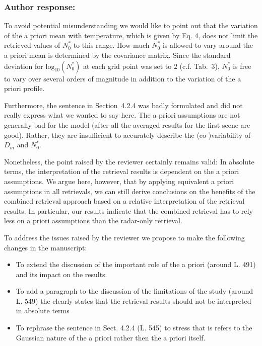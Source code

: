 \documentclass[11pt]{scrartcl}
\begin{document}
\subsubsection*{Author response:}

To avoid potential misunderstanding we would like to point out that the
variation of the a priori mean with temperature, which is given by Eq. 4, does
not limit the retrieved values of $N_0^*$ to this range. How much $N_0^*$ is
allowed to vary around the a priori mean is determined by the covariance matrix.
Since the standard deviation for $\text{log}_{10}(N_0^*)$ at each grid point was
set to $2$ (c.f. Tab.~3), $N_0^*$ is free to vary over several orders of
magnitude in addition to the variation of the a priori profile.

Furthermore, the sentence in Section~4.2.4 was badly formulated and did not
really express what we wanted to say here. The a priori assumptions are not
generally bad for the model (after all the averaged results for the first scene
are good). Rather, they are insufficient to accurately describe the (co-)variability
of $D_m$ and $N_0^*$.

Nonetheless, the point raised by the reviewer certainly remains valid: In
absolute terms, the interpretation of the retrieval results is dependent on the
a priori assumptions. We argue here, however, that by applying equivalent a
priori assumptions in all retrievals, we can still derive conclusions on the
benefits of the combined retrieval approach based on a relative interpretation
of the retrieval results. In particular, our results indicate that the combined
retrieval has to rely less on a priori assumptions than the radar-only
retrieval. 

To address the issues raised by the reviewer we propose to make the following
changes in the manuscript:

\begin{itemize}
\item To extend the discussion of the important role of the a priori (around L. 491) and
  its impact on the results.
\item To add a paragraph to the discussion of the limitations of the study (around L. 549)
  the clearly states that the retrieval results should not be interpreted in absolute terms
\item To rephrase the sentence in Sect. 4.2.4 (L. 545) to stress that is refers to the
  Gaussian nature of the a priori rather then the a priori itself.
\end{itemize}
\end{document}
